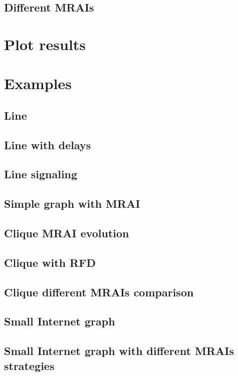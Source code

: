 \documentclass[10pt,journal,onecolumn]{IEEEtran}
\begin{document}
\subsection{Different MRAIs}
\label{subsec:MRAI_types}

\section{Plot results}
\label{sec:plot_results}

\section{Examples}
\label{sec:examples}

\subsection{Line}
\label{subsec:ex_line}

\subsection{Line with delays}
\label{subsec:ex_line_delay}

\subsection{Line signaling}
\label{subsec:ex_line_signaling}

\subsection{Simple graph with MRAI}
\label{subsec:simple_graph_with_MRAI}

\subsection{Clique MRAI evolution}
\label{subsec:clique_evolution}

\subsection{Clique with RFD}
\label{subsec:clique_rfd}

\subsection{Clique different MRAIs comparison}
\label{subsec:clique_different_mrais}

\subsection{Small Internet graph}
\label{subsec:small_internet_graph}

\subsection{Small Internet graph with different MRAIs strategies}
\label{subsec:small_internet_graph_multiple_MRAIs}

\printindex


\end{document}
